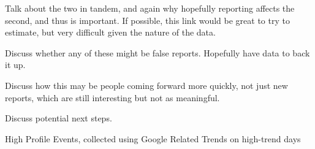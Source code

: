 \documentclass[AER,draftmode]{AEA}
\begin{document}
Talk about the two in tandem, and again why hopefully reporting affects the second, and thus is important. If possible, this link would be great to try to estimate, but very difficult given the nature of the data. 

Discuss whether any of these might be false reports. Hopefully have data to back it up.

Discuss how this may be people coming forward more quickly, not just new reports, which are still interesting but not as meaningful.

Discuss potential next steps.


\clearpage




\clearpage
\appendix

\begin{table}[]
\caption{High Profile Events, collected using Google Related Trends on high-trend days}

\end{table}
\end{document}
